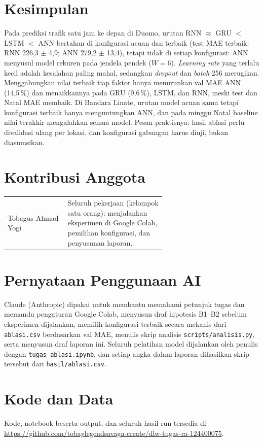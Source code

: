 \documentclass[conference,a4paper]{IEEEtran}
\begin{document}
\section{Kesimpulan}
Pada prediksi trafik satu jam ke depan di Duomo, urutan RNN $\approx$ GRU $<$ LSTM $<$ ANN bertahan di konfigurasi acuan dan terbaik (test MAE terbaik: RNN 226,3 $\pm$ 4,9; ANN 279,2 $\pm$ 13,4), tetapi tidak di setiap konfigurasi: ANN menyusul model rekuren pada jendela pendek ($W=6$). \textit{Learning rate} yang terlalu kecil adalah kesalahan paling mahal, sedangkan \textit{dropout} dan \textit{batch} 256 merugikan. Menggabungkan nilai terbaik tiap faktor hanya menurunkan val MAE ANN (14,5\,\%) dan menaikkannya pada GRU (9,6\,\%), LSTM, dan RNN, meski test dan Natal MAE membaik. Di Bandara Linate, urutan model acuan sama tetapi konfigurasi terbaik hanya menguntungkan ANN, dan pada minggu Natal baseline nilai terakhir mengalahkan semua model. Pesan praktisnya: hasil ablasi perlu divalidasi ulang per lokasi, dan konfigurasi gabungan harus diuji, bukan diasumsikan.

\section*{Kontribusi Anggota}
\begin{tabular}{@{}lp{0.62\linewidth}@{}}
  Tobagus Ahmad Yogi & Seluruh pekerjaan (kelompok satu orang): menjalankan eksperimen di Google Colab, pemilihan konfigurasi, dan penyusunan laporan. \\
\end{tabular}

\section*{Pernyataan Penggunaan AI}
Claude (Anthropic) dipakai untuk membantu memahami petunjuk tugas dan memandu pengaturan Google Colab, menyusun draf hipotesis B1--B2 sebelum eksperimen dijalankan, memilih konfigurasi terbaik secara mekanis dari \texttt{ablasi.csv} berdasarkan val MAE, menulis skrip analisis \texttt{scripts/analisis.py}, serta menyusun draf laporan ini. Seluruh pelatihan model dijalankan oleh penulis dengan \texttt{tugas\_ablasi.ipynb}, dan setiap angka dalam laporan dihasilkan skrip tersebut dari \texttt{hasil/ablasi.csv}.

\section*{Kode dan Data}
Kode, notebook beserta output, dan seluruh hasil run tersedia di \url{https://github.com/tobaylegendsavaga-create/dlw-tugas-ra-124400075}.



\end{document}

